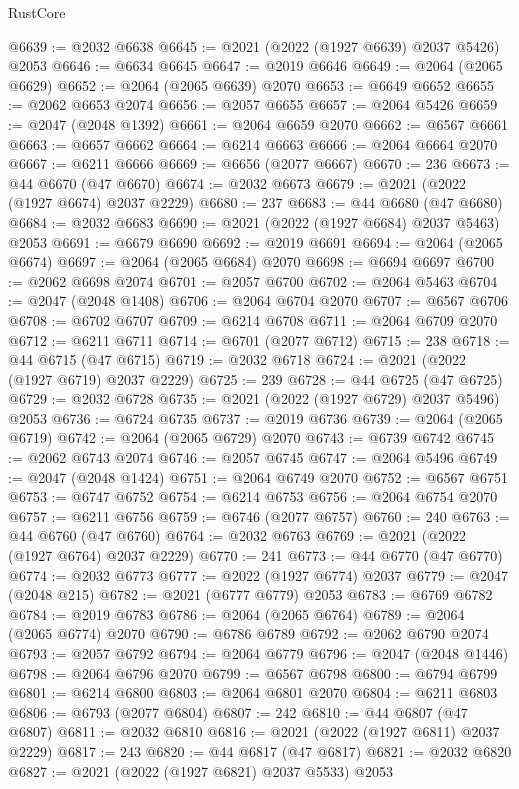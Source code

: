 \begin{lexlean}{RustCore}
\begin{coremodule}
@6639 := @2032 @6638
@6645 := @2021 (@2022 (@1927 @6639) @2037 @5426) @2053
@6646 := @6634 @6645
@6647 := @2019 @6646
@6649 := @2064 (@2065 @6629)
@6652 := @2064 (@2065 @6639) @2070
@6653 := @6649 @6652
@6655 := @2062 @6653 @2074
@6656 := @2057 @6655
@6657 := @2064 @5426
@6659 := @2047 (@2048 @1392)
@6661 := @2064 @6659 @2070
@6662 := @6567 @6661
@6663 := @6657 @6662
@6664 := @6214 @6663
@6666 := @2064 @6664 @2070
@6667 := @6211 @6666
@6669 := @6656 (@2077 @6667)
@6670 := 236
@6673 := @44 @6670 (@47 @6670)
@6674 := @2032 @6673
@6679 := @2021 (@2022 (@1927 @6674) @2037 @2229)
@6680 := 237
@6683 := @44 @6680 (@47 @6680)
@6684 := @2032 @6683
@6690 := @2021 (@2022 (@1927 @6684) @2037 @5463) @2053
@6691 := @6679 @6690
@6692 := @2019 @6691
@6694 := @2064 (@2065 @6674)
@6697 := @2064 (@2065 @6684) @2070
@6698 := @6694 @6697
@6700 := @2062 @6698 @2074
@6701 := @2057 @6700
@6702 := @2064 @5463
@6704 := @2047 (@2048 @1408)
@6706 := @2064 @6704 @2070
@6707 := @6567 @6706
@6708 := @6702 @6707
@6709 := @6214 @6708
@6711 := @2064 @6709 @2070
@6712 := @6211 @6711
@6714 := @6701 (@2077 @6712)
@6715 := 238
@6718 := @44 @6715 (@47 @6715)
@6719 := @2032 @6718
@6724 := @2021 (@2022 (@1927 @6719) @2037 @2229)
@6725 := 239
@6728 := @44 @6725 (@47 @6725)
@6729 := @2032 @6728
@6735 := @2021 (@2022 (@1927 @6729) @2037 @5496) @2053
@6736 := @6724 @6735
@6737 := @2019 @6736
@6739 := @2064 (@2065 @6719)
@6742 := @2064 (@2065 @6729) @2070
@6743 := @6739 @6742
@6745 := @2062 @6743 @2074
@6746 := @2057 @6745
@6747 := @2064 @5496
@6749 := @2047 (@2048 @1424)
@6751 := @2064 @6749 @2070
@6752 := @6567 @6751
@6753 := @6747 @6752
@6754 := @6214 @6753
@6756 := @2064 @6754 @2070
@6757 := @6211 @6756
@6759 := @6746 (@2077 @6757)
@6760 := 240
@6763 := @44 @6760 (@47 @6760)
@6764 := @2032 @6763
@6769 := @2021 (@2022 (@1927 @6764) @2037 @2229)
@6770 := 241
@6773 := @44 @6770 (@47 @6770)
@6774 := @2032 @6773
@6777 := @2022 (@1927 @6774) @2037
@6779 := @2047 (@2048 @215)
@6782 := @2021 (@6777 @6779) @2053
@6783 := @6769 @6782
@6784 := @2019 @6783
@6786 := @2064 (@2065 @6764)
@6789 := @2064 (@2065 @6774) @2070
@6790 := @6786 @6789
@6792 := @2062 @6790 @2074
@6793 := @2057 @6792
@6794 := @2064 @6779
@6796 := @2047 (@2048 @1446)
@6798 := @2064 @6796 @2070
@6799 := @6567 @6798
@6800 := @6794 @6799
@6801 := @6214 @6800
@6803 := @2064 @6801 @2070
@6804 := @6211 @6803
@6806 := @6793 (@2077 @6804)
@6807 := 242
@6810 := @44 @6807 (@47 @6807)
@6811 := @2032 @6810
@6816 := @2021 (@2022 (@1927 @6811) @2037 @2229)
@6817 := 243
@6820 := @44 @6817 (@47 @6817)
@6821 := @2032 @6820
@6827 := @2021 (@2022 (@1927 @6821) @2037 @5533) @2053

\end{coremodule}
\end{lexlean}
